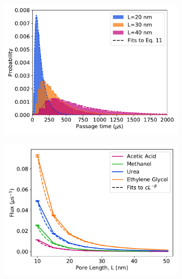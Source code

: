 \documentclass{article}
\begin{document}
  \begin{figure}
  \centering
  \begin{subfigure}{0.475\textwidth}
  \includegraphics[width=\textwidth]{fpt_distributions.pdf}
  \caption{}\label{fig:fpt_distributions}
  \end{subfigure}
  \begin{subfigure}{0.475\textwidth}
  \includegraphics[width=\textwidth]{flux_curves.pdf}
  \caption{}\label{fig:flux_curves_regular}
  \end{subfigure}

\end{figure}
\end{document}
